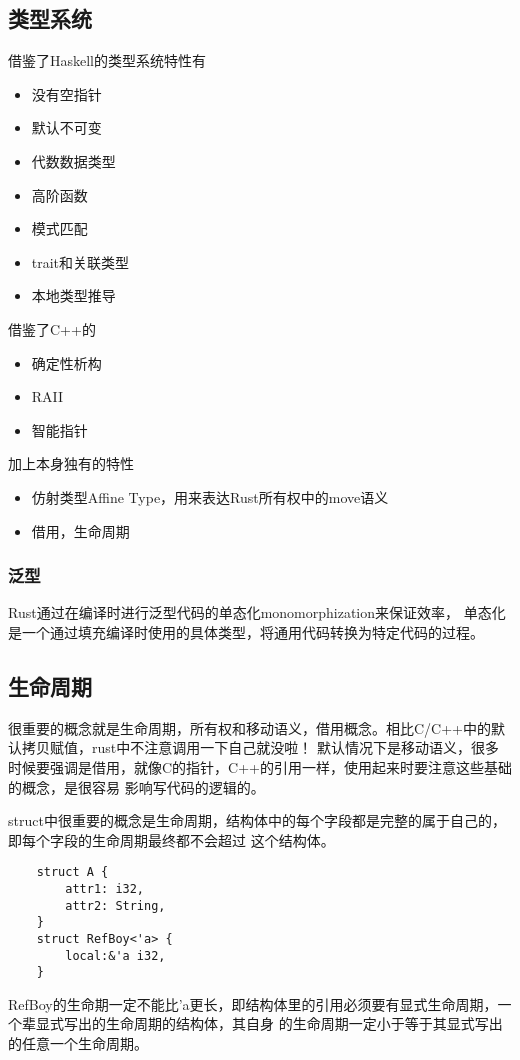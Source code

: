 \subsection{类型系统}
借鉴了Haskell的类型系统特性有
\begin{itemize}
    \item {没有空指针}
    \item {默认不可变}
    \item {代数数据类型}
    \item {高阶函数}
    \item {模式匹配}
    \item {trait和关联类型}
    \item {本地类型推导}
\end{itemize}
借鉴了C++的
\begin{itemize}
    \item {确定性析构}
    \item {RAII}
    \item {智能指针}
\end{itemize}
加上本身独有的特性
\begin{itemize}
    \item {仿射类型Affine Type，用来表达Rust所有权中的move语义}
    \item {借用，生命周期}
\end{itemize}

\subsubsection{泛型}
Rust通过在编译时进行泛型代码的单态化monomorphization来保证效率，
单态化是一个通过填充编译时使用的具体类型，将通用代码转换为特定代码的过程。


\subsection{生命周期}
很重要的概念就是生命周期，所有权和移动语义，借用概念。相比C/C++中的默认拷贝赋值，rust中不注意调用一下自己就没啦！
默认情况下是移动语义，很多时候要强调是借用，就像C的指针，C++的引用一样，使用起来时要注意这些基础的概念，是很容易
影响写代码的逻辑的。

struct中很重要的概念是生命周期，结构体中的每个字段都是完整的属于自己的，即每个字段的生命周期最终都不会超过
这个结构体。
\begin{lstlisting}
    struct A {
        attr1: i32,
        attr2: String,
    }
    struct RefBoy<'a> {
        local:&'a i32,
    }
\end{lstlisting}
RefBoy的生命期一定不能比'a更长，即结构体里的引用必须要有显式生命周期，一个辈显式写出的生命周期的结构体，其自身
的生命周期一定小于等于其显式写出的任意一个生命周期。


